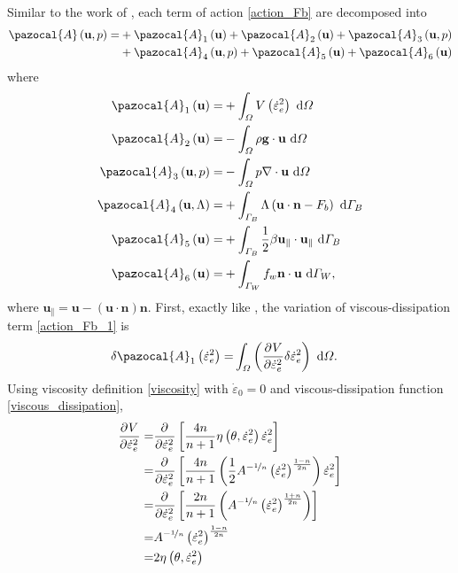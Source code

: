 Similar to the work of \citet{dukowicz_2010}, each term of action \cref{action_Fb} are decomposed into
\begin{align}
  \label{action_Fb_parts}
  \pazocal{A} \left(\mathbf{u}, p\right) = &
  + \pazocal{A}_1 \left(\mathbf{u} \right)
  + \pazocal{A}_2 \left(\mathbf{u} \right)
  + \pazocal{A}_3 \left(\mathbf{u}, p \right) \\ &
  + \pazocal{A}_4 \left(\mathbf{u}, p \right) 
  + \pazocal{A}_5 \left(\mathbf{u} \right) 
  + \pazocal{A}_6 \left(\mathbf{u} \right) 
\end{align}
where
\begin{align}
  \label{action_Fb_1}
  \pazocal{A}_1 \left(\mathbf{u} \right) = &+ \int_{\Omega} V\left( \dot{\varepsilon}_e^2 \right) \d{\Omega} \\ 
  \label{action_Fb_2}
  \pazocal{A}_2 \left(\mathbf{u} \right) = &- \int_{\Omega} \rho \mathbf{g} \cdot \mathbf{u} \d{\Omega} \\
  \label{action_Fb_3}
  \pazocal{A}_3 \left(\mathbf{u}, p \right) = &- \int_{\Omega} p \nabla \cdot \mathbf{u} \d{\Omega} \\
  \label{action_Fb_4}
  \pazocal{A}_4 \left(\mathbf{u}, \Lambda \right) = &+ \int_{\Gamma_B} \Lambda \left( \mathbf{u} \cdot \mathbf{n} - F_b \right) \d{\Gamma_B} \\
  \label{action_Fb_5}
  \pazocal{A}_5 \left(\mathbf{u} \right) = &+ \int_{\Gamma_B} \frac{1}{2} \beta \mathbf{u}_{\Vert} \cdot \mathbf{u}_{\Vert} \d{\Gamma_B} \\
  \label{action_Fb_6}
  \pazocal{A}_6 \left(\mathbf{u} \right) = &+ \int_{\Gamma_W} f_w \mathbf{n} \cdot \mathbf{u} \d{\Gamma_W},
\end{align}
where $\mathbf{u}_{\Vert} = \mathbf{u} - \left( \mathbf{u} \cdot \mathbf{n} \right) \mathbf{n}$.
First, exactly like \citet{dukowicz_2010}, the variation of viscous-dissipation term \cref{action_Fb_1} is
\begin{align}
  \label{intermediate_action_variation_Fb_1}
  \delta \pazocal{A}_1 \left( \dot{\varepsilon}_e^2 \right) = & \int_{\Omega} \left( \parder{V}{\dot{\varepsilon}_e^2} \delta \dot{\varepsilon}_e^2 \right) \d{\Omega}.
\end{align}
Using viscosity definition \cref{viscosity} with $\dot{\varepsilon}_0 = 0$ and viscous-dissipation function \cref{viscous_dissipation},
\begin{align*}
  \frac{\partial{^{}} V}{\partial \dot{\varepsilon}_e^2{^{}} } =& \frac{\partial{^{}} }{\partial \dot{\varepsilon}_e^2{^{}} } \left[ \frac{4n}{n+1} \eta\left(\theta, \dot{\varepsilon}_e^2 \right) \dot{\varepsilon}_e^2 \right] \\
  =& \frac{\partial{^{}} }{\partial \dot{\varepsilon}_e^2{^{}} } \left[ \frac{4n}{n+1} \left( \frac{1}{2} A^{-\nicefrac{1}{n}} \left( \dot{\varepsilon}_e^2 \right)^{\frac{1-n}{2n}} \right) \dot{\varepsilon}_e^2 \right] \\
  =& \frac{\partial{^{}} }{\partial \dot{\varepsilon}_e^2{^{}} } \left[ \frac{2n}{n+1} \left( A^{-\nicefrac{1}{n}} \left( \dot{\varepsilon}_e^2 \right)^{\frac{1+n}{2n}} \right) \right] \\
  =& A^{-\nicefrac{1}{n}} \left( \dot{\varepsilon}_e^2 \right)^{\frac{1-n}{2n}} \\
  =& 2 \eta \left( \theta, \dot{\varepsilon}_e^2 \right)
\end{align*}
